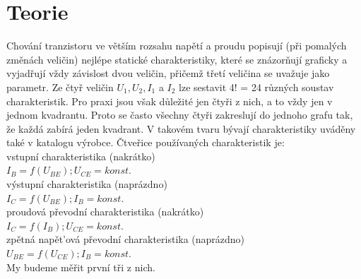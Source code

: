 \documentclass[a4paper]{article}
\begin{document}
\section*{Teorie}
Chování tranzistoru ve větším rozsahu napětí a proudu popisují (při pomalých změnách veličin) nejlépe
statické charakteristiky, které se znázorňují graficky a vyjadřují vždy závislost dvou veličin, přičemž
třetí veličina se uvažuje jako parametr. Ze čtyř veličin $U_1, U_2, I_1$ a $I_2$ lze sestavit 4! = 24 různých soustav
charakteristik. Pro praxi jsou však důležité jen čtyři z nich, a to vždy jen v jednom kvadrantu. Proto se
často všechny čtyři zakreslují do jednoho grafu tak, že každá zabírá jeden kvadrant. V takovém tvaru
bývají charakteristiky uváděny také v katalogu výrobce.
Čtveřice používaných charakteristik je:\\
vstupní charakteristika (nakrátko)\\
$I_B = f(U_{BE}); U_{CE}= konst.$\\
výstupní charakteristika (naprázdno)\\
$I_C = f(U_{BE}); I_B= konst.$\\
proudová převodní charakteristika (nakrátko)\\
$I_C = f(I_B); U_{CE} = konst.$\\
zpětná napět’ová převodní charakteristika (naprázdno)\\
$U_{BE} = f(U_{CE}); I_B= konst.$\\
My budeme měřit první tři z nich.\\
\end{document}
